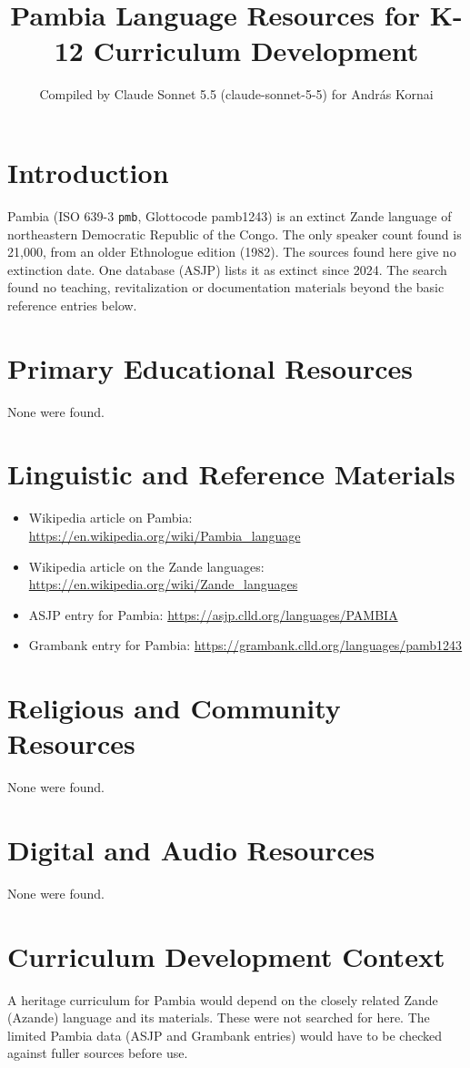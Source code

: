 \documentclass[12pt]{article}
\title{Pambia Language Resources for K-12 Curriculum Development}
\author{Compiled by Claude Sonnet 5.5 (claude-sonnet-5-5) for Andr\'as Kornai}
\date{}
\begin{document}
\maketitle

\section{Introduction}
Pambia (ISO 639-3 \texttt{pmb}, Glottocode pamb1243) is an extinct Zande language of northeastern Democratic Republic of the Congo. The only speaker count found is 21,000, from an older Ethnologue edition (1982). The sources found here give no extinction date. One database (ASJP) lists it as extinct since 2024. The search found no teaching, revitalization or documentation materials beyond the basic reference entries below.

\section{Primary Educational Resources}
None were found.

\section{Linguistic and Reference Materials}
\begin{itemize}
\item Wikipedia article on Pambia: \url{https://en.wikipedia.org/wiki/Pambia_language}
\item Wikipedia article on the Zande languages: \url{https://en.wikipedia.org/wiki/Zande_languages}
\item ASJP entry for Pambia: \url{https://asjp.clld.org/languages/PAMBIA}
\item Grambank entry for Pambia: \url{https://grambank.clld.org/languages/pamb1243}
\end{itemize}

\section{Religious and Community Resources}
None were found.

\section{Digital and Audio Resources}
None were found.

\section{Curriculum Development Context}
A heritage curriculum for Pambia would depend on the closely related Zande (Azande) language and its materials. These were not searched for here. The limited Pambia data (ASJP and Grambank entries) would have to be checked against fuller sources before use.
\end{document}
